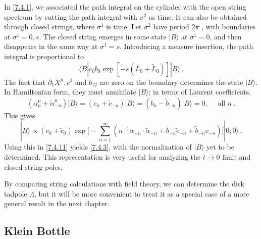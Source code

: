 In \eqref{7.4.1}, we associated the path integral on the cylinder with the open string spectrum by cutting the path integral with $\sigma^{2}$ as time. 
It can also be obtained through closed strings, where $\sigma^{1}$ is time. Let $\sigma^{2}$ have period $2 \pi$ , with boundaries at $\sigma^{1}=0, s$. The closed string emerges in some state $|B\rangle$ at $\sigma^{1}=0$, and then disappears in the same way at $\sigma^{1}=s $. 
Introducing a measure insertion, the path integral is proportional to 
\begin{equation}
	\langle B|c_{0} b_{0} \exp [-s(L_{0}+\tilde{L}_{0})]| B\rangle \:. \label{7.4.11} 
\end{equation}
The fact that $\partial_{1} X^{\mu}, c^{1}$ and $b_{12}$ are zero on the boundary determines the state $|B\rangle$. 
In Hamiltonian form, they must annihilate $|B\rangle$; in terms of Laurent coefficients, 
\begin{equation}
	(\alpha_{n}^{\mu}+\tilde{\alpha}_{-n}^{\mu})|B\rangle=(c_{n}+\tilde{c}_{-n})|B\rangle=(b_{n}-\tilde{b}_{-n})|B\rangle=0, \quad \text { all } n\:. \label{7.4.12} 
\end{equation}
This gives 
\begin{equation}
	|B\rangle \propto (c_{0}+\tilde{c}_{0}) \exp \biggl[-\sum_{n=1}^{\infty}(n^{-1} \alpha_{-n} \cdot \tilde{\alpha}_{-n}+b_{-n} \tilde{c}_{-n}+\tilde{b}_{-n} c_{-n})\biggr]|0 ; 0\rangle \:. \label{7.4.13} 
\end{equation}
Using this in \eqref{7.4.11} yields \eqref{7.4.3}, with the normalization of $|B\rangle$ yet to be determined. This representation is very useful for analyzing the $t \rightarrow 0$ limit and closed string poles. 

By comparing string calculations with field theory, we can determine the disk tadpole $\Lambda$, but it will be more convenient to treat it as a special case of a more general result in the next chapter. 

\subsection*{Klein Bottle} 

